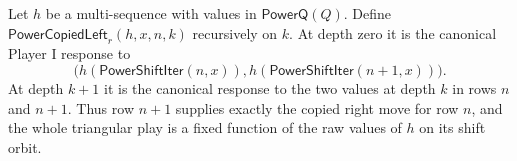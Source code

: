 \begin{definition}
Let $h$ be a multi-sequence with values in $\mathsf{PowerQ}(Q)$.  Define
$\mathsf{PowerCopiedLeft}_r(h,x,n,k)$ recursively on $k$.  At depth zero it
is the canonical Player I response to
\[
\bigl(h(\mathsf{PowerShiftIter}(n,x)),
h(\mathsf{PowerShiftIter}(n+1,x))\bigr).
\]
At depth $k+1$ it is the canonical response to the two values at depth $k$
in rows $n$ and $n+1$.  Thus row $n+1$ supplies exactly the copied right
move for row $n$, and the whole triangular play is a fixed function of the
raw values of $h$ on its shift orbit.
\end{definition}
